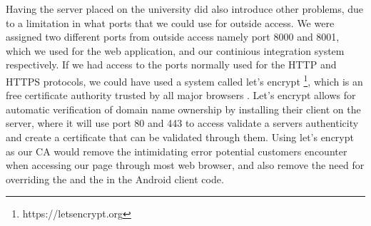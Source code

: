 Having the server placed on the university did also introduce other problems, due to a limitation in what ports that we could use for outside access. 
We were assigned two different ports from outside access namely port 8000 and 8001, which we used for the web application, and our continious integration system respectively. 
If we had access to the ports normally used for the HTTP and HTTPS protocols, we could have used a system called let's encrypt \footnote{https://letsencrypt.org}, which is an free certificate authority trusted by all major browsers \parencite{lets_encrypt_all_browsers}. Let's encrypt allows for automatic verification of domain name ownership by installing their client on the server, where it will use port 80 and 443 to access validate a servers authenticity and create a certificate that can be validated through them. Using let's encrypt as our CA would remove the intimidating error potential customers encounter when accessing our page through most web browser, and also remove the need for overriding the  and the  in the Android client code.